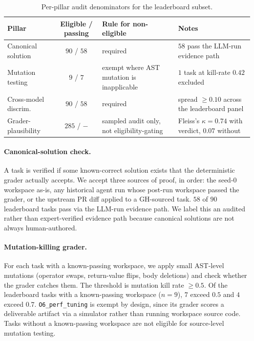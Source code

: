 \documentclass{article}
\begin{document}
\begin{table}[h]
\centering
\caption{Per-pillar audit denominators for the leaderboard subset.}
\label{tab:verified-pillars}
\small
\setlength{\tabcolsep}{4pt}
\begin{tabularx}{\linewidth}{l c X X}
\toprule
Pillar & Eligible / passing & Rule for non-eligible & Notes \\
\midrule
Canonical solution     & $90$ / $58$ & required & $58$ pass the LLM-run evidence path \\
Mutation testing       & $9$ / $7$   & exempt where AST mutation is inapplicable & $1$ task at kill-rate $0.42$ excluded \\
Cross-model discrim.   & $90$ / $58$ & required & spread $\geq 0.10$ across the leaderboard panel \\
Grader-plausibility    & $285$ / $-$ & sampled audit only, not eligibility-gating & Fleiss's $\kappa=0.74$ with verdict, $0.07$ without \\
\bottomrule
\end{tabularx}
\end{table}

\paragraph{Canonical-solution check.} A task is verified if some known-correct solution exists that the deterministic grader actually accepts. We accept three sources of proof, in order: the seed-0 workspace as-is, any historical agent run whose post-run workspace passed the grader, or the upstream PR diff applied to a GH-sourced task. $58$ of $90$ leaderboard tasks pass via the LLM-run evidence path. We label this an audited rather than expert-verified evidence path because canonical solutions are not always human-authored.

\paragraph{Mutation-killing grader.} For each task with a known-passing workspace, we apply small AST-level mutations (operator swaps, return-value flips, body deletions) and check whether the grader catches them. The threshold is mutation kill rate $\geq 0.5$. Of the leaderboard tasks with a known-passing workspace ($n=9$), $7$ exceed $0.5$ and $4$ exceed $0.7$. \texttt{O6\_perf\_tuning} is exempt by design, since its grader scores a deliverable artifact via a simulator rather than running workspace source code. Tasks without a known-passing workspace are not eligible for source-level mutation testing.
\end{document}
